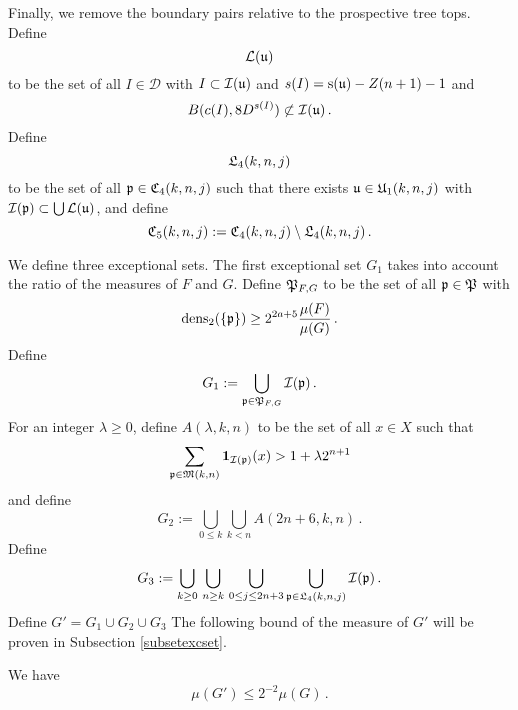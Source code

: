 {Finally, we remove the boundary pairs relative to the prospective tree tops. Define
\begin{equation}
    \label{eq L def}
    \mathcal{L}(\mathfrak u)
\end{equation}
to be the set of all $I \in \mathcal{D}$ with $I \subset \mathcal{I}(\mathfrak u)$ and $s(I) = \mathrm{s}(\mathfrak u) - Z(n+1) - 1$ and
\begin{equation}
    B(c(I), 8 D^{s(I)})\not \subset \mathcal{I}(\mathfrak u)\, .
\end{equation}
Define
\begin{equation}
    \label{eq L4 def}
    \mathfrak L_4(k,n,j)
\end{equation}
to be the set of all $\mathfrak p\in \mathfrak C_4(k,n,j)$ such that there exists
$\mathfrak u\in \mathfrak U_1(k,n,j)$
with $\mathcal{I}(\mathfrak p) \subset \bigcup \mathcal{L}(\mathfrak u)$, and define
\begin{equation}\label{defc5}
\mathfrak C_5(k,n,j):=\mathfrak C_4(k,n,j)
  \setminus \mathfrak L_4(k,n,j)\, .
\end{equation}


We define three exceptional sets.
The first exceptional set $G_1$ takes into account the ratio of the measures of $F$ and $G$.
Define $\mathfrak P_{F,G}$ to be the set of all $\mathfrak p\in \mathfrak P$
with
\begin{equation}
    \operatorname{\operatorname{dens}}_2(\{\mathfrak p\})\ge 2^{2a+5}\frac{\mu(F)}{\mu(G)}\,.
\end{equation}
Define
\begin{equation}\label{definegone}
    G_1:=\bigcup_{\mathfrak p\in \mathfrak P_{F,G} }\mathcal{I}(\mathfrak p)\, .
\end{equation}
For an integer $\lambda\ge 0$, define  $A(\lambda,k,n)$ to be the set  of all $x\in X$ such that
\begin{equation}
    \label{eq Aoverlap def}
    \sum_{\mathfrak p \in \mathfrak{M}(k,n)}\mathbf{1}_{\mathcal{I}(\mathfrak p)}(x)>1+\lambda 2^{n+1}
\end{equation}
and define
\begin{equation}\label{definegone2}
    G_2:=
\bigcup_{0\le  k}\bigcup_{k< n}
A(2n+6,k,n)\, .
\end{equation}
Define
    \begin{equation}\label{defineg3}
        G_3 :=
        \bigcup_{k\ge 0}\, \bigcup_{n \geq k}\,
        \bigcup_{0\le j\le 2n+3}
        \bigcup_{\mathfrak p \in \mathfrak L_4 (k,n,j)}
        \mathcal{I}(\mathfrak p)\, .
     \end{equation}
Define $G'=G_1\cup G_2 \cup G_3$
The following bound of the measure of $G'$ will be proven in
Subsection \ref{subsetexcset}.
\begin{lemma}\label{exceptional set}
We have
\begin{equation}
    \mu(G')\le 2^{-2}\mu(G)\, .
\end{equation}
\end{lemma}

}
